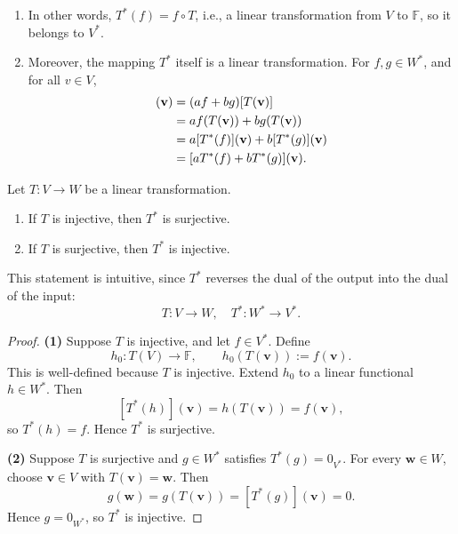 \begin{enumerate}
  \item In other words, \( T^*(f) = f \circ T \), i.e., a linear transformation from \( V \) to \( \mathbb{F} \), so it belongs to \( V^* \).

  \item Moreover, the mapping \( T^* \) itself is a linear transformation. For \( f, g \in W^* \), and for all \( v \in V \),
  \begin{align*}
  [T^*(af + bg)]({\bf v}) &= (af + bg)[T({\bf v})] \\
  &= a f(T({\bf v})) + b g(T({\bf v})) \\
  &= a [T^*(f)]({\bf v}) + b [T^*(g)]({\bf v}) \\
  &= [a T^*(f) + b T^*(g)]({\bf v}).
  \end{align*}
\end{enumerate}

\begin{proposition}\label{prop: adjoint-injectivity-surjectivity}
Let \( T : V \to W \) be a linear transformation.
\begin{enumerate}
  \item If \( T \) is injective, then \( T^* \) is surjective.
  \item If \( T \) is surjective, then \( T^* \) is injective.
\end{enumerate}
This statement is intuitive, since \( T^* \) reverses the dual of the output into the dual of the input:
\[
T : V \to W, \quad T^* : W^* \to V^*.
\]
\end{proposition}

\begin{proof}
\textbf{(1)} Suppose \(T\) is injective, and let \(f\in V^*\). Define
\[
h_0:T(V)\to\mathbb F,\qquad h_0(T(\mathbf v)):=f(\mathbf v).
\]
This is well-defined because \(T\) is injective. Extend \(h_0\) to a linear functional \(h\in W^*\). Then
\[
[T^*(h)](\mathbf v)=h(T(\mathbf v))=f(\mathbf v),
\]
so \(T^*(h)=f\). Hence \(T^*\) is surjective.

\textbf{(2)} Suppose \(T\) is surjective and \(g\in W^*\) satisfies \(T^*(g)=0_{V^*}\). For every \(\mathbf w\in W\), choose \(\mathbf v\in V\) with \(T(\mathbf v)=\mathbf w\). Then
\[
g(\mathbf w)=g(T(\mathbf v))=[T^*(g)](\mathbf v)=0.
\]
Hence \(g=0_{W^*}\), so \(T^*\) is injective.
\end{proof}

